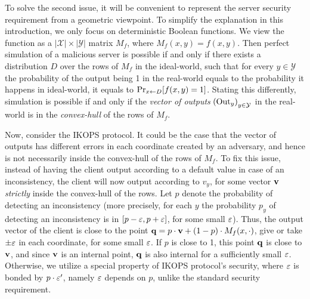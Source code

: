 \documentclass{llncs}
\newcommand{\X}{\mathcal{X}}
\newcommand{\Y}{\mathcal{Y}}
\renewcommand{\q}{\myvec{q}}
\renewcommand{\v}{\myvec{v}}
\newcommand{\Out}{\operatorname{Out}}
\begin{document}
To solve the second issue, it will be convenient to represent the server security requirement from a geometric viewpoint. To simplify the explanation in this introduction, we only focus on deterministic Boolean functions. We view the function as a $|\X|\times|\Y|$ matrix $M_f$, where $M_f(x,y)=f(x,y)$. Then perfect simulation of a malicious server is possible if and only if there exists a distribution $D$ over the rows of $M_f$ in the ideal-world, such that for every $y\in\Y$ the probability of the output being 1 in the real-world equals to the probability it happens in ideal-world, \ie  it equals to $\Pr_{x\leftarrow D}[f(x,y)=1]$. Stating this differently, simulation is possible if and only if the \emph{vector of outputs} $\vect{\Out_y}_{y\in\Y}$ in the real-world is in the \emph{convex-hull} of the rows of $M_f$.

Now, consider the IKOPS protocol. It could be the case that the vector of outputs has different errors in each coordinate created by an adversary, and hence is not necessarily inside the convex-hull of the rows of $M_f$. To fix this issue, instead of having the client output according to a default value in case of an inconsistency, the client will now output according to $v_y$, for some vector $\v$ \emph{strictly} inside the convex-hull of the rows. 
Let $p$ denote the probability of detecting an inconsistency
(more precisely, for each $y$ the probability $p_y$ of detecting an inconsistency is in $[p-\varepsilon,p+\varepsilon]$, for some small $\varepsilon$).
Thus, the output vector of the client is close to the point $\q=p\cdot \v + (1-p)\cdot M_f(x,\cdot)$, give or take $\pm \varepsilon$ in each coordinate, for some small $\varepsilon$.
If $p$ is close to 1, this point $\q$ is close to $\v$, and since $\v$ is an internal point, $\q$ is also internal for a sufficiently small $\varepsilon$. Otherwise, we utilize a special property of IKOPS protocol's security, where $\varepsilon$ is bonded by $p\cdot \varepsilon'$, namely $\varepsilon$ depends on $p$, unlike the standard security requirement.
\end{document}
